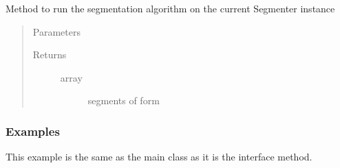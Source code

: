 \documentclass[letterpaper,10pt,english]{sphinxmanual}
\begin{document}
\begin{fulllineitems}
\label{\detokenize{generated/seg1d.Segmenter.segment:seg1d.Segmenter.segment}}
\sphinxAtStartPar
Method to run the segmentation algorithm on the current
Segmenter instance
\begin{quote}\begin{description}
\item[{Parameters}] \leavevmode\begin{description}
\item[{}] \leavevmode
\end{description}

\item[{Returns}] \leavevmode\begin{description}
\item[{ array}] \leavevmode
\sphinxAtStartPar
segments of form

\end{description}

\end{description}\end{quote}
\subsubsection*{Examples}

\sphinxAtStartPar
This example is the same as the main  class as it is the
interface method.


\end{fulllineitems}
\end{document}
